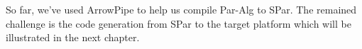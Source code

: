 So far, we've used ArrowPipe to help us compile Par-Alg to SPar. The remained challenge is the code generation from SPar to the target platform which will be illustrated in the next chapter.
